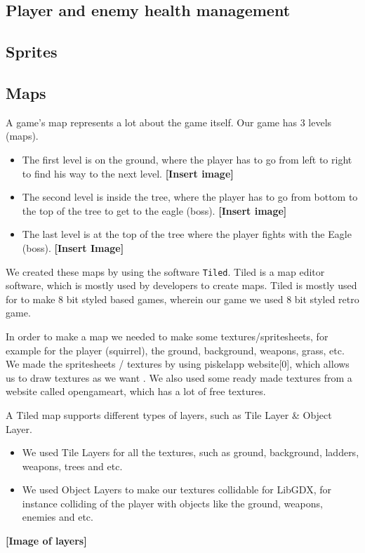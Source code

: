 \documentclass[12p]{article}
\begin{document}

\subsection{Player and enemy health management} \label{DocPlayerAndHealthManagement}


\subsection{Sprites} \label{DocSprites}


\subsection{Maps} \label{DocMaps}
A game's map represents a lot about the game itself. Our game has 3 levels (maps).

\begin{itemize}
 \item The first level is on the ground, where the player has to go from left to right to find his way to the next level. \textbf{[Insert image]}
 \item The second level is inside the tree, where the player has to go from bottom to the top of the tree to get to the eagle (boss). \textbf{[Insert image]}
 \item The last level is at the top of the tree where the player fights with the Eagle (boss). \textbf{[Insert Image]}
\end{itemize}

We created these maps by using the software \texttt{Tiled}. Tiled is a map editor software, which is mostly used by developers to create maps. Tiled is mostly used for to make 8 bit styled based games, wherein our game we used 8 bit styled retro game.

In order to make a map we needed to make some textures/spritesheets, for example for the player (squirrel), the ground, background, weapons, grass, etc. We made the spritesheets / textures by using piskelapp website[0], which allows us to draw textures as we want . We also used some ready made textures from a website called opengameart, which has a lot of free textures.

A Tiled map supports different types of layers, such as Tile Layer \& Object Layer. 
\begin{itemize}
\item We used Tile Layers for all the textures, such as ground, background, ladders, weapons, trees and etc. 
\item We used Object Layers to make our textures collidable for LibGDX, for instance colliding of the player with objects like the ground, weapons, enemies and etc.
\end{itemize}
\textbf{[Image of layers]}
\end{document}
